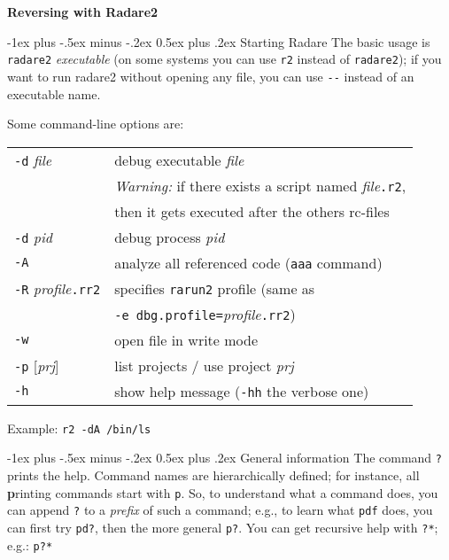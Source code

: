 \documentclass[a4paper,landscape]{article}
\makeatletter
\renewcommand{\section}{\@startsection{section}{1}{0mm}%
                                {-1ex plus -.5ex minus -.2ex}%
                                {0.5ex plus .2ex}%
                                {\normalfont\large\bfseries}}
\makeatother
\begin{document}
\footnotesize
\begin{multicols*}{3}
\setlength{\premulticols}{1pt}
\setlength{\postmulticols}{1pt}
\setlength{\multicolsep}{1pt}
\setlength{\columnsep}{2pt}

\begin{center}
     \Large{\textbf{Reversing with Radare2}} \\
\end{center}

\section{Starting Radare}
The basic usage is \texttt{radare2} \textit{executable} (on some systems you can
use \texttt{r2} instead of \texttt{radare2}); if you want to run radare2 without
opening any file, you can use \texttt{-{}-} instead of an executable name.

Some command-line options are:

\begin{tabular}{@{}ll@{}}
\texttt{-d} \textit{file} & debug executable \textit{file} \\
	& \emph{Warning:} if there exists a script named \textit{file}\texttt{.r2}, \\
	& then it gets executed after the others rc-files \\
\texttt{-d} \textit{pid} & debug process \textit{pid} \\
\texttt{-A}	& analyze all referenced code (\texttt{aaa} command) \\
\texttt{-R} \textit{profile}\texttt{.rr2} & specifies \texttt{rarun2} profile (same as \\ & \texttt{-e dbg.profile=}\textit{profile}\texttt{.rr2}) \\
\texttt{-w}	& open file in write mode \\
\texttt{-p} [\textit{prj}] & list projects / use project \textit{prj} \\
\texttt{-h} & show help message (\texttt{-hh} the verbose one)
\end{tabular}

Example: \texttt{r2 -dA /bin/ls}

\section{General information}
The command \texttt{?} prints the help. Command names are hierarchically defined; for instance, all \textbf{p}rinting commands start with \texttt{p}. So, to understand what a command does, you can append \texttt{?} to a \emph{prefix} of such a command; e.g., to learn what \texttt{pdf} does, you can first try \texttt{pd?}, then the more general \texttt{p?}.
You can get recursive help with \texttt{?*}; e.g.: \texttt{p?*}


\end{multicols*}
\end{document}
